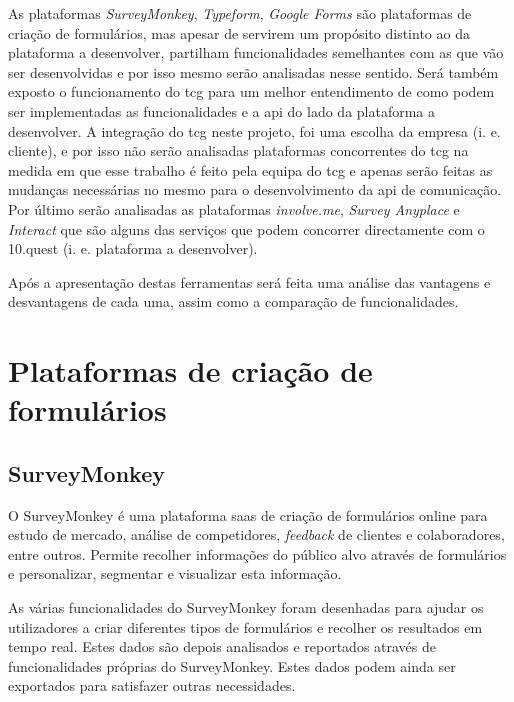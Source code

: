 As plataformas \textit{SurveyMonkey}\cite{surveymonkey}, \textit{Typeform}\cite{typeform}, \textit{Google Forms}\cite{googleform} são plataformas de criação de formulários, mas apesar de servirem um propósito distinto ao da plataforma a desenvolver, partilham funcionalidades semelhantes com as que vão ser desenvolvidas e por isso mesmo serão analisadas nesse sentido. Será também exposto o funcionamento do \acrshort{tcg} para um melhor entendimento de como podem ser implementadas as funcionalidades e a \acrshort{api} do lado da plataforma a desenvolver. A integração do \acrshort{tcg} neste projeto, foi uma escolha da empresa (i. e. cliente), e por isso não serão analisadas plataformas concorrentes do \acrshort{tcg} na medida em que esse trabalho é feito pela equipa do \acrshort{tcg} e apenas serão feitas as mudanças necessárias no mesmo para o desenvolvimento da \acrshort{api} de comunicação. Por último serão analisadas as plataformas \textit{involve.me}\cite{involve}, \textit{Survey Anyplace}\cite{surveyA} e \textit{Interact}\cite{interact} que são alguns das serviços que podem concorrer directamente com o 10.quest (i. e. plataforma a desenvolver).

Após a apresentação destas ferramentas será feita uma análise das vantagens e desvantagens de cada uma, assim como a comparação de funcionalidades.

\section{Plataformas de criação de formulários}
\label{formulários}

\subsection{SurveyMonkey}
\label{surveyMonkeyM}

O SurveyMonkey é uma plataforma \acrfull{saas} de criação de formulários online para estudo de mercado, análise de competidores, \textit{feedback} de clientes e colaboradores, entre outros. Permite recolher informações do público alvo através de formulários e personalizar, segmentar e visualizar esta informação.

As várias funcionalidades do SurveyMonkey foram desenhadas para ajudar os utilizadores a criar diferentes tipos de formulários e recolher os resultados em tempo real. Estes dados são depois analisados e reportados através de funcionalidades próprias do SurveyMonkey. Estes dados podem ainda ser exportados para satisfazer outras necessidades. 

